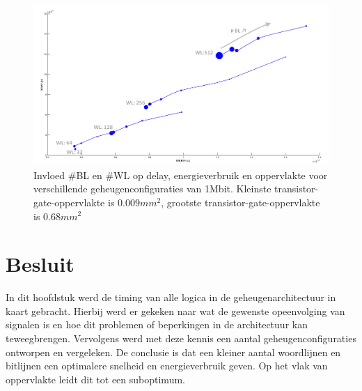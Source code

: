 \begin{figure}[!ht]
  \centering
  \includegraphics[scale=0.6]{../fig/hfdstk-timing-all-sol2.png}
  \caption[Delay, energieverbruik en oppervlakte van alle geheugenconfiguraties]{Invloed \#BL en \#WL op delay, energieverbruik en oppervlakte voor verschillende geheugenconfiguraties van 1Mbit. Kleinste transistor-gate-oppervlakte is $0.009mm^{2}$, grootste transistor-gate-oppervlakte is $0.68mm^{2}$}
  \label{fig:final20all2}
\end{figure} 

\section{Besluit}
In dit hoofdstuk werd de timing van alle logica in de geheugenarchitectuur in kaart gebracht. Hierbij werd er gekeken naar wat de gewenste opeenvolging van signalen is en hoe dit problemen of beperkingen in de architectuur kan teweegbrengen. Vervolgens werd met deze kennis een aantal geheugenconfiguraties ontworpen en vergeleken. De conclusie is dat een kleiner aantal woordlijnen en bitlijnen een optimalere snelheid en energieverbruik geven. Op het vlak van oppervlakte leidt dit tot een suboptimum.
